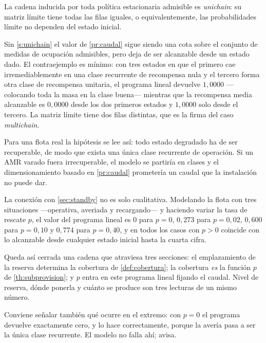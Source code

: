 \begin{supuesto}
\label{s:unichain}
La cadena inducida por toda política estacionaria admisible es \emph{unichain}:
su matriz límite tiene todas las filas iguales, o equivalentemente, las
probabilidades límite no dependen del estado inicial.
\end{supuesto}

\begin{observacion}
\label{obs:multichain}
Sin \cref{s:unichain} el valor de \cref{pr:caudal} sigue siendo una cota sobre el
conjunto de medidas de ocupación admisibles, pero deja de ser alcanzable desde un
estado dado. El contraejemplo es mínimo: con tres estados en que el primero cae
irremediablemente en una clase recurrente de recompensa nula y el tercero forma
otra clase de recompensa unitaria, el programa lineal devuelve $1{,}0000$
—colocando toda la masa en la clase buena— mientras que la recompensa media
alcanzable es $0{,}0000$ desde los dos primeros estados y $1{,}0000$ solo desde
el tercero. La matriz límite tiene dos filas distintas, que es la firma del caso
\emph{multichain}.

Para una flota real la hipótesis se lee así: todo estado degradado ha de ser
recuperable, de modo que exista una única clase recurrente de operación. Si un
AMR varado fuera irrecuperable, el modelo se partiría en clases y el
dimensionamiento basado en \cref{pr:caudal} prometería un caudal que la
instalación no puede dar.
\end{observacion}

\begin{observacion}
\label{obs:rescate-caudal}
La conexión con \cref{sec:standby} no es solo cualitativa. Modelando la flota con
tres situaciones —operativa, averiada y recargando— y haciendo variar la tasa de
rescate $p$, el valor del programa lineal es $0$ para $p=0$, $0{,}273$ para
$p=0{,}02$, $0{,}600$ para $p=0{,}10$ y $0{,}774$ para $p=0{,}40$, y en todos los
casos con $p>0$ coincide con lo alcanzable desde cualquier estado inicial hasta
la cuarta cifra.

Queda así cerrada una cadena que atraviesa tres secciones: el emplazamiento de la
reserva determina la cobertura de \cref{def:cobertura}; la cobertura \emph{es} la
función $p$ de \cref{th:subprovision}; y $p$ entra en este programa lineal
fijando el caudal. Nivel de reserva, dónde ponerla y cuánto se produce son tres
lecturas de un mismo número.

Conviene señalar también qué ocurre en el extremo: con $p=0$ el programa devuelve
exactamente cero, y lo hace correctamente, porque la avería pasa a ser la única
clase recurrente. El modelo no falla ahí; avisa.
\end{observacion}

